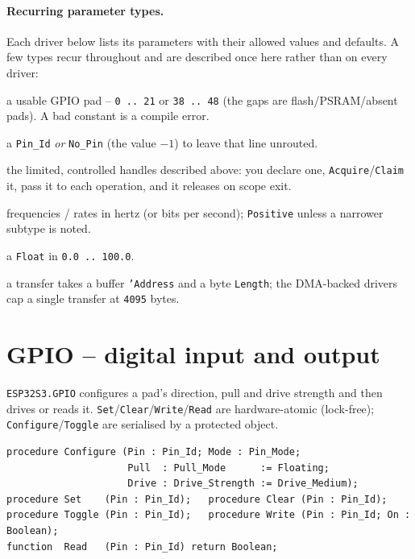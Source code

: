 \paragraph{Recurring parameter types.} Each driver below lists its parameters
with their allowed values and defaults. A few types recur throughout and are
described once here rather than on every driver:
\begin{description}[style=nextline]
\item[\texttt{Pin\_Id}] a usable GPIO pad -- \texttt{0\,..\,21} or
  \texttt{38\,..\,48} (the gaps are flash/PSRAM/absent pads). A bad constant is a
  compile error.
\item[\texttt{Optional\_Pin}] a \texttt{Pin\_Id} \emph{or} \texttt{No\_Pin} (the
  value $-1$) to leave that line unrouted.
\item[Ownership handles (\texttt{Session}, \texttt{Channel}, \texttt{Reader},
  \texttt{Unit}, \texttt{Timer})] the limited, controlled handles described above:
  you declare one, \texttt{Acquire}/\texttt{Claim} it, pass it to each operation,
  and it releases on scope exit.
\item[\texttt{...\_Hz}, \texttt{Freq}, \texttt{Baud}, \texttt{Bit\_Rate}]
  frequencies / rates in hertz (or bits per second); \texttt{Positive} unless a
  narrower subtype is noted.
\item[\texttt{...\_Percent}] a \texttt{Float} in \texttt{0.0\,..\,100.0}.
\item[Buffers] a transfer takes a buffer \texttt{'Address} and a byte
  \texttt{Length}; the DMA-backed drivers cap a single transfer at \texttt{4095}
  bytes.
\end{description}

\section{GPIO -- digital input and output}

\texttt{ESP32S3.GPIO} configures a pad's direction, pull and drive strength and
then drives or reads it. \texttt{Set}/\texttt{Clear}/\texttt{Write}/\texttt{Read}
are hardware-atomic (lock-free); \texttt{Configure}/\texttt{Toggle} are serialised
by a protected object.

\begin{lstlisting}
procedure Configure (Pin : Pin_Id; Mode : Pin_Mode;
                     Pull  : Pull_Mode      := Floating;
                     Drive : Drive_Strength := Drive_Medium);
procedure Set    (Pin : Pin_Id);   procedure Clear (Pin : Pin_Id);
procedure Toggle (Pin : Pin_Id);   procedure Write (Pin : Pin_Id; On : Boolean);
function  Read   (Pin : Pin_Id) return Boolean;
\end{lstlisting}


